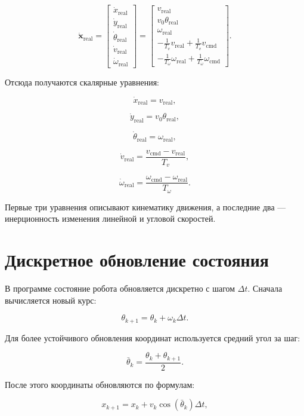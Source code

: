 \documentclass[12pt,a4paper]{article}
\newcommand{\vect}[1]{\mathbf{#1}}
\begin{document}
\[
\dot{\vect{x}}_{\mathrm{real}}
=
\begin{bmatrix}
\dot{x}_{\mathrm{real}} \\
\dot{y}_{\mathrm{real}} \\
\dot{\theta}_{\mathrm{real}} \\
\dot{v}_{\mathrm{real}} \\
\dot{\omega}_{\mathrm{real}}
\end{bmatrix}
=
\begin{bmatrix}
v_{\mathrm{real}} \\
v_0\theta_{\mathrm{real}} \\
\omega_{\mathrm{real}} \\
-\frac{1}{T_v}v_{\mathrm{real}} + \frac{1}{T_v}v_{\mathrm{cmd}} \\
-\frac{1}{T_\omega}\omega_{\mathrm{real}} + \frac{1}{T_\omega}\omega_{\mathrm{cmd}}
\end{bmatrix}.
\]

Отсюда получаются скалярные уравнения:

\[
\dot{x}_{\mathrm{real}} = v_{\mathrm{real}},
\]

\[
\dot{y}_{\mathrm{real}} = v_0\theta_{\mathrm{real}},
\]

\[
\dot{\theta}_{\mathrm{real}} = \omega_{\mathrm{real}},
\]

\[
\dot{v}_{\mathrm{real}} = \frac{v_{\mathrm{cmd}} - v_{\mathrm{real}}}{T_v},
\]

\[
\dot{\omega}_{\mathrm{real}} =
\frac{\omega_{\mathrm{cmd}} - \omega_{\mathrm{real}}}{T_\omega}.
\]

Первые три уравнения описывают кинематику движения, а последние два —
инерционность изменения линейной и угловой скоростей.

\section{Дискретное обновление состояния}

В программе состояние робота обновляется дискретно с шагом \(\Delta t\).
Сначала вычисляется новый курс:

\[
\theta_{k+1} = \theta_k + \omega_k \Delta t.
\]

Для более устойчивого обновления координат используется средний угол за шаг:

\[
\bar{\theta}_k =
\frac{\theta_k + \theta_{k+1}}{2}.
\]

После этого координаты обновляются по формулам:

\[
x_{k+1} =
x_k + v_k \cos(\bar{\theta}_k)\Delta t,
\]
\end{document}
